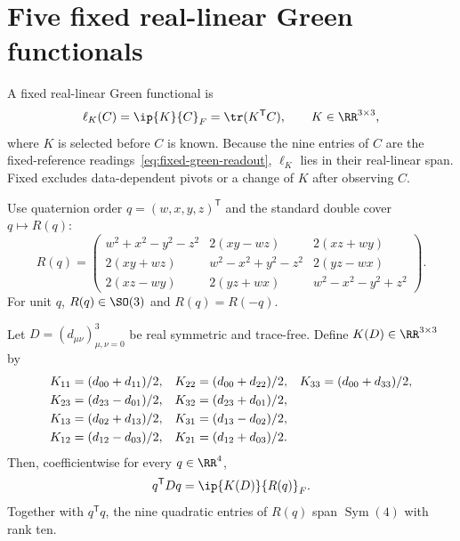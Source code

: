 \section{Five fixed real-linear Green functionals}
\label{sec:fixed_five}

\begin{definition}\label{def:fixed-functional}
A fixed real-linear Green functional is
\[
 \ell_K(C)=\ip{K}{C}_F=\tr(K^\mathsf TC),
 \qquad K\in\RR^{3\times3},
\]
where $K$ is selected before $C$ is known.  Because the nine entries of
$C$ are the fixed-reference readings~\eqref{eq:fixed-green-readout},
$\ell_K$ lies in their real-linear span.  Fixed excludes data-dependent
pivots or a change of $K$ after observing $C$.
\end{definition}

Use quaternion order $q=(w,x,y,z)^\mathsf T$ and the standard double cover
$q\mapsto R(q)$:
\begin{equation}\label{eq:quaternion-rotation}
R(q)=
\begin{pmatrix}
w^2+x^2-y^2-z^2&2(xy-wz)&2(xz+wy)\\
2(xy+wz)&w^2-x^2+y^2-z^2&2(yz-wx)\\
2(xz-wy)&2(yz+wx)&w^2-x^2-y^2+z^2
\end{pmatrix}.
\end{equation}
For unit $q$, $R(q)\in\SO(3)$ and $R(q)=R(-q)$.

\begin{lemma}
\label{lem:quaternion-dictionary}
Let $D=(d_{\mu\nu})_{\mu,\nu=0}^3$ be real symmetric and trace-free.  Define
$K(D)\in\RR^{3\times3}$ by
\begin{align}
K_{11}&=(d_{00}+d_{11})/2,&
K_{22}&=(d_{00}+d_{22})/2,&
K_{33}&=(d_{00}+d_{33})/2,\notag\\
K_{23}&=(d_{23}-d_{01})/2,&
K_{32}&=(d_{23}+d_{01})/2,\notag\\
K_{13}&=(d_{02}+d_{13})/2,&
K_{31}&=(d_{13}-d_{02})/2,\label{eq:inverse-dictionary}\\
K_{12}&=(d_{12}-d_{03})/2,&
K_{21}&=(d_{12}+d_{03})/2.\notag
\end{align}
Then, coefficientwise for every $q\in\RR^4$,
\begin{equation}\label{eq:dictionary-readback}
 q^\mathsf TDq=\ip{K(D)}{R(q)}_F.
\end{equation}
Together with $q^\mathsf Tq$, the nine quadratic entries of $R(q)$ span
$\operatorname{Sym}(4)$ with rank ten.
\end{lemma}

